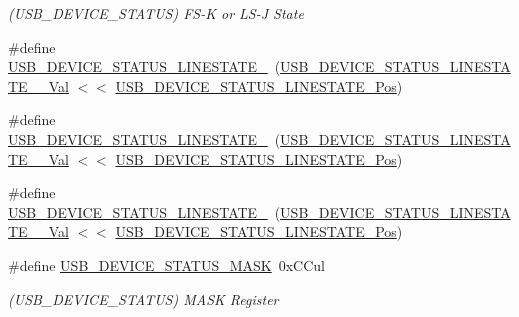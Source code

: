 \begin{DoxyCompactItemize}
\begin{DoxyCompactList}\small\item\em (U\+S\+B\+\_\+\+D\+E\+V\+I\+C\+E\+\_\+\+S\+T\+A\+T\+US) F\+S-\/K or L\+S-\/J State \end{DoxyCompactList}\item 
\#define \mbox{\hyperlink{group___s_a_m_d21___u_s_b_ga4d4cdebaf2c14eb7ec9941b21f86d5ea}{U\+S\+B\+\_\+\+D\+E\+V\+I\+C\+E\+\_\+\+S\+T\+A\+T\+U\+S\+\_\+\+L\+I\+N\+E\+S\+T\+A\+T\+E\+\_}}~(\mbox{\hyperlink{group___s_a_m_d21___u_s_b_ga6bb81d63d6025c58fd88e81a5522be60}{U\+S\+B\+\_\+\+D\+E\+V\+I\+C\+E\+\_\+\+S\+T\+A\+T\+U\+S\+\_\+\+L\+I\+N\+E\+S\+T\+A\+T\+E\+\_\+\_\+\+Val}} $<$$<$ \mbox{\hyperlink{group___s_a_m_d21___u_s_b_ga8e62dd599a4f4a34806c7677b9eaec13}{U\+S\+B\+\_\+\+D\+E\+V\+I\+C\+E\+\_\+\+S\+T\+A\+T\+U\+S\+\_\+\+L\+I\+N\+E\+S\+T\+A\+T\+E\+\_\+\+Pos}})
\item 
\#define \mbox{\hyperlink{group___s_a_m_d21___u_s_b_ga83af8c388e648b49d763853c9866b98c}{U\+S\+B\+\_\+\+D\+E\+V\+I\+C\+E\+\_\+\+S\+T\+A\+T\+U\+S\+\_\+\+L\+I\+N\+E\+S\+T\+A\+T\+E\+\_}}~(\mbox{\hyperlink{group___s_a_m_d21___u_s_b_ga9be5dcded3e3389526af7731a279e9a7}{U\+S\+B\+\_\+\+D\+E\+V\+I\+C\+E\+\_\+\+S\+T\+A\+T\+U\+S\+\_\+\+L\+I\+N\+E\+S\+T\+A\+T\+E\+\_\+\_\+\+Val}} $<$$<$ \mbox{\hyperlink{group___s_a_m_d21___u_s_b_ga8e62dd599a4f4a34806c7677b9eaec13}{U\+S\+B\+\_\+\+D\+E\+V\+I\+C\+E\+\_\+\+S\+T\+A\+T\+U\+S\+\_\+\+L\+I\+N\+E\+S\+T\+A\+T\+E\+\_\+\+Pos}})
\item 
\#define \mbox{\hyperlink{group___s_a_m_d21___u_s_b_ga0ef28c02a659e93619fbabfc08dda9ac}{U\+S\+B\+\_\+\+D\+E\+V\+I\+C\+E\+\_\+\+S\+T\+A\+T\+U\+S\+\_\+\+L\+I\+N\+E\+S\+T\+A\+T\+E\+\_}}~(\mbox{\hyperlink{group___s_a_m_d21___u_s_b_gaff76a55f7d0040b772b73bc0164b9717}{U\+S\+B\+\_\+\+D\+E\+V\+I\+C\+E\+\_\+\+S\+T\+A\+T\+U\+S\+\_\+\+L\+I\+N\+E\+S\+T\+A\+T\+E\+\_\+\_\+\+Val}} $<$$<$ \mbox{\hyperlink{group___s_a_m_d21___u_s_b_ga8e62dd599a4f4a34806c7677b9eaec13}{U\+S\+B\+\_\+\+D\+E\+V\+I\+C\+E\+\_\+\+S\+T\+A\+T\+U\+S\+\_\+\+L\+I\+N\+E\+S\+T\+A\+T\+E\+\_\+\+Pos}})
\item 
\#define \mbox{\hyperlink{group___s_a_m_d21___u_s_b_ga4b9317688bbac4ee71ae1032c4a47cae}{U\+S\+B\+\_\+\+D\+E\+V\+I\+C\+E\+\_\+\+S\+T\+A\+T\+U\+S\+\_\+\+M\+A\+SK}}~0x\+C\+Cul
\begin{DoxyCompactList}\small\item\em (U\+S\+B\+\_\+\+D\+E\+V\+I\+C\+E\+\_\+\+S\+T\+A\+T\+US) M\+A\+SK Register \end{DoxyCompactList}\item 
$$
\end{DoxyCompactItemize}
